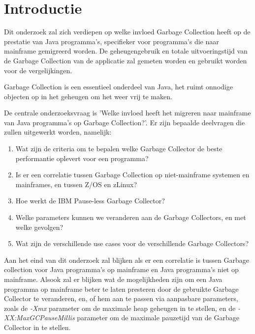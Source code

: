 
\section{Introductie}%
\label{sec:introductie}
Dit onderzoek zal zich verdiepen op welke invloed Garbage Collection heeft op de prestatie van Java programma's, specifieker voor programma's die naar mainframe gemigreerd worden.
De geheugengebruik en totale uitvoeringstijd van de Garbage Collection van de applicatie zal gemeten worden en gebruikt worden voor de vergelijkingen.

Garbage Collection is een essentieel onderdeel van Java, het ruimt onnodige objecten op in het geheugen om het weer vrij te maken.

De centrale onderzoeksvraag is 'Welke invloed heeft het migreren naar mainframe van Java programma's op Garbage Collection?'.
Er zijn bepaalde deelvragen die zullen uitgewerkt worden, namelijk:

\begin{enumerate}
    \item Wat zijn de criteria om te bepalen welke Garbage Collector de beste performantie oplevert voor een programma? 
    \item Is er een correlatie tussen Garbage Collection op niet-mainframe systemen en mainframes, en tussen Z/OS en zLinux?
    \item Hoe werkt de IBM Pause-less Garbage Collector? 
    \item Welke parameters kunnen we veranderen aan de Garbage Collectors, en met welke gevolgen? 
    \item Wat zijn de verschillende use cases voor de verschillende Garbage Collectors?  
\end{enumerate}

Aan het eind van dit onderzoek zal blijken als er een correlatie is tussen Garbage collection voor Java programma's op mainframe en Java programma's niet op mainframe.
Alsook zal er blijken wat de mogelijkheden zijn om een Java programma op mainframe beter te laten presteren door de gebruikte Garbage Collector te veranderen, en, of hem aan te passen via aanpasbare parameters, zoals de \textit{-Xmx} parameter om de maximale heap geheugen in te stellen, en de \textit{-XX:MaxGCPauseMillis} parameter om de maximale pauzetijd van de Garbage Collector in te stellen.


